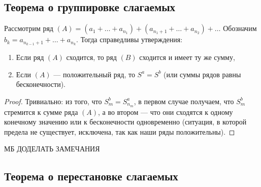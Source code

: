 \subsection{Теорема о группировке слагаемых}

\begin{theorem}
	Рассмотрим ряд \((A) = (a_1 + \ldots + a_{n_1}) + (a_{n_1+1} + \ldots + a_{n_2}) + \ldots\) Обозначим \(b_k = a_{n_{k-1}+1} + \ldots + a_{n_k}\).  Тогда справедливы утверждения:
	\begin{enumerate}
		\item Если ряд \((A)\) сходится, то ряд \((B)\) сходится и имеет ту же сумму,
		\item Если \((A)\) --- положительный ряд, то \(S^a = S^b\) (или суммы рядов равны бесконечности).
	\end{enumerate}
\end{theorem}
\begin{proof}
	Тривиально: из того, что \(S_m^b = S_{n_m}^a\), в первом случае получаем, что \(S_m^b\) стремится к сумме ряда \((A)\), а во втором --- что они сходятся к одному конечному значению или к бесконечности одновременно (ситуация, в которой предела не существует, исключена, так как наши ряды положительны).
\end{proof}

МБ ДОДЕЛАТЬ ЗАМЕЧАНИЯ

\subsection{Теорема о перестановке слагаемых}


